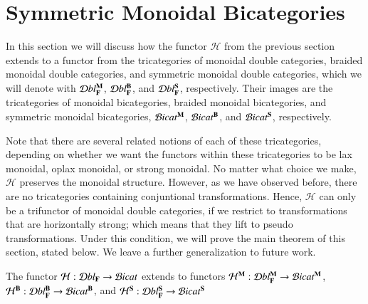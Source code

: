 \documentclass{amsart}
\begin{document}
\section{Symmetric Monoidal Bicategories}
\label{sec:constr-symm-mono}
In this section we will discuss how the functor $\mathcal{H}$ from the previous section extends to a functor from the tricategories of monoidal double categories, braided monoidal double categories, and symmetric monoidal double categories, which we will denote with $\mathcal{D}bl_{\bf F}^{\bf M}$, $\mathcal{D}bl_{\bf F}^{\bf B}$, and $\mathcal{D}bl_{\bf F}^{\bf S}$, respectively. Their images are the tricategories  of monoidal bicategories, braided monoidal bicategories, and symmetric monoidal bicategories, $\mathcal{B}icat^{\bf M}$, $\mathcal{B}icat^{\bf B}$, and $\mathcal{B}icat^{\bf S}$, respectively.

Note that there are several related notions of each of these tricategories, depending on whether we want the functors within these tricategories to be lax monoidal, oplax monoidal, or strong monoidal. No matter what choice we make, $\mathcal{H}$ preserves the monoidal structure. However, as we have observed before, there are no tricategories containing conjuntional transformations. Hence, $\mathcal{H}$ can only be a trifunctor of monoidal double categories, if we restrict to transformations that are horizontally strong; which means that they lift to pseudo transformations. Under this condition, we will prove the main theorem of this section, stated below. We leave a further generalization to future work.

\begin{thm}\label{thm:trifunctor2}
The functor $\mathcal{H}: \mathcal{D}bl_{\bf F} \rightarrow \mathcal{B}icat$ extends to functors $\mathcal{H}^{\bf M}: \mathcal{D}bl_{\bf F}^{\bf M} \rightarrow \mathcal{B}icat^{\bf M}$, $\mathcal{H}^{\bf B}: \mathcal{D}bl_{\bf F}^{\bf B} \rightarrow \mathcal{B}icat^{\bf B}$, and $\mathcal{H}^{\bf S}: \mathcal{D}bl_{\bf F}^{\bf S} \rightarrow \mathcal{B}icat^{\bf S}$ 
\end{thm}
\end{document}

